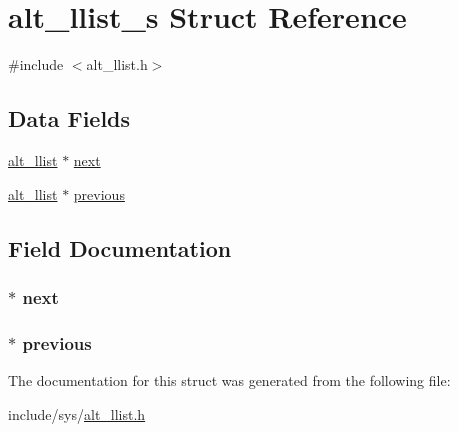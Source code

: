 \hypertarget{structalt__llist__s}{\section{alt\-\_\-llist\-\_\-s \-Struct \-Reference}
\label{structalt__llist__s}
}


{\ttfamily \#include $<$alt\-\_\-llist.\-h$>$}

\subsection*{\-Data \-Fields}
\begin{DoxyCompactItemize}
\item 
\hyperlink{alt__llist_8h_a94b50b44e6bd512a432af0b840d49aa4}{alt\-\_\-llist} $\ast$ \hyperlink{structalt__llist__s_a92b9c95abfb939845f3336b7ff25c86a}{next}
\item 
\hyperlink{alt__llist_8h_a94b50b44e6bd512a432af0b840d49aa4}{alt\-\_\-llist} $\ast$ \hyperlink{structalt__llist__s_aba192396f3a9aee3c2007fe98da9729a}{previous}
\end{DoxyCompactItemize}


\subsection{\-Field \-Documentation}
\hypertarget{structalt__llist__s_a92b9c95abfb939845f3336b7ff25c86a}{
\subsubsection[{next}]{$\ast$ {\bf next}}}\label{structalt__llist__s_a92b9c95abfb939845f3336b7ff25c86a}
\hypertarget{structalt__llist__s_aba192396f3a9aee3c2007fe98da9729a}{
\subsubsection[{previous}]{$\ast$ {\bf previous}}}\label{structalt__llist__s_aba192396f3a9aee3c2007fe98da9729a}


\-The documentation for this struct was generated from the following file\-:\begin{DoxyCompactItemize}
\item 
include/sys/\hyperlink{alt__llist_8h}{alt\-\_\-llist.\-h}\end{DoxyCompactItemize}
